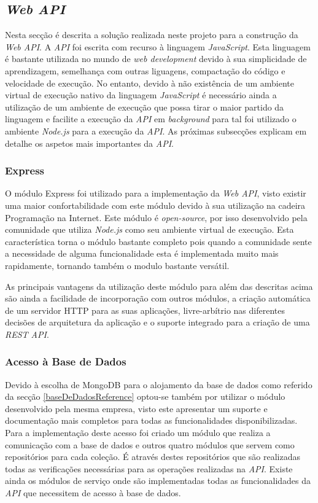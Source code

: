 \documentclass[12pt,a4paper]{article}
\begin{document}
\subsection{\textit{Web API}}
Nesta secção é descrita a solução realizada neste projeto para a construção da \textit{Web API}. A \textit{API} foi escrita com recurso à linguagem \textit{JavaScript}\cite{javascriptReference}.
Esta linguagem é bastante utilizada no mundo de \textit{web development} devido à sua simplicidade de aprendizagem, semelhança com outras liguagens, 
compactação do código e velocidade de execução. No entanto, devido à não existência de um ambiente virtual de execução nativo da linguagem \textit{JavaScript}\cite{javascriptReference}
é necessário ainda a utilização de um ambiente de execução que possa tirar o maior partido da linguagem e facilite a execução da \textit{API} em \textit{background}
para tal foi utilizado o ambiente \textit{Node.js}\cite{nodeJsReference} para a execução da \textit{API}. As próximas subsecções explicam em detalhe os aspetos mais importantes da \textit{API}.

\subsubsection{Express}
O módulo Express\cite{expressReference} foi utilizado para a implementação da \textit{Web API}, visto existir uma maior confortabilidade com este módulo devido à sua
utilização na cadeira Programação na Internet. Este módulo é \textit{open-source}, por isso desenvolvido pela comunidade que utiliza \textit{Node.js}\cite{nodeJsReference}
como seu ambiente virtual de execução. Esta característica torna o módulo bastante completo pois quando a comunidade sente a necessidade de alguma funcionalidade
esta é implementada muito mais rapidamente, tornando também o modulo bastante versátil.

As principais vantagens da utilização deste módulo para além das descritas acima são ainda a facilidade de incorporação com outros módulos,
a criação automática de um servidor HTTP para as suas aplicações, livre-arbítrio nas diferentes decisões de arquitetura da aplicação e o suporte
integrado para a criação de uma \textit{REST API}.

\subsubsection{Acesso à Base de Dados}
Devido à escolha de MongoDB\cite{mongoDBReference} para o alojamento da base de dados como referido da secção \ref{baseDeDadosReference} optou-se também por utilizar o módulo desenvolvido pela mesma empresa, visto este apresentar 
um suporte e documentação mais completos para todas as funcionalidades disponibilizadas. Para a implementação deste acesso foi criado um módulo que
realiza a comunicação com a base de dados e outros quatro módulos que servem como repositórios para cada coleção. É através destes repositórios que 
são realizadas todas as verificações necessárias para as operações realizadas na \textit{API}. Existe ainda os módulos de serviço onde são implementadas
todas as funcionalidades da \textit{API} que necessitem de acesso à base de dados.
\end{document}
